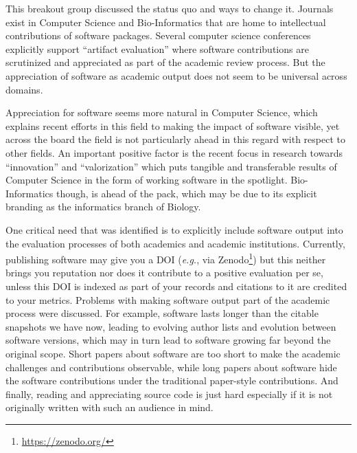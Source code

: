 \documentclass[a4paper,UKenglish]{dagrep}
\newcommand{\eg}{\emph{e.g.},\xspace}
\begin{document}
This breakout group discussed the status quo and ways to change it. Journals exist in Computer Science and Bio-Informatics that are home to intellectual contributions of software packages. Several computer science conferences explicitly support ``artifact evaluation'' where software contributions are scrutinized and appreciated as part of the academic review process. But the appreciation of software as academic output does not seem to be universal across domains.

Appreciation for software seems more natural in Computer Science, which explains recent efforts in this field to making the impact of software visible, yet across the board the field is not particularly ahead in this regard with respect to other fields. An important positive factor is the recent focus in research towards ``innovation'' and ``valorization'' which puts tangible and transferable results of Computer Science in the form of working software in the spotlight. Bio-Informatics though, is ahead of the pack, which may be due to its explicit branding as the informatics branch of Biology.

One critical need that was identified is to explicitly include software output into the evaluation processes of both academics and academic institutions. Currently, publishing software may give you a DOI (\eg via Zenodo\footnote{\url{https://zenodo.org/}}) but this neither brings you reputation nor does it contribute to a positive evaluation per se, unless this DOI is indexed as part of your records and citations to it are credited to your metrics.
Problems with making software output part of the academic process were discussed. For example, software lasts longer than the citable snapshots we have now, leading to evolving author lists and evolution between software versions, which may in turn lead to software growing far beyond the original scope. Short papers about software are too short to make the academic challenges and contributions observable, while long papers about software hide the software contributions under the traditional paper-style contributions. And finally, reading and appreciating source code is just hard especially if it is not originally written with such an audience in mind.
\end{document}
